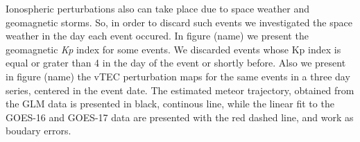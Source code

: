 Ionospheric perturbations also can take place due to space weather and geomagnetic storms. So, in order to discard such events we investigated the space weather in the day each event occured. In figure (name) we present the geomagnetic \textit{Kp} index for some events. We discarded events whose Kp index is equal or grater than 4 in the day of the event or shortly before. Also we present in figure (name) the vTEC perturbation maps for the same events in a three day series, centered in the event date. The estimated meteor trajectory, obtained from the GLM data is presented in black, continous line, while the linear fit to the GOES-16 and GOES-17 data are presented with the red dashed line, and work as boudary errors.
